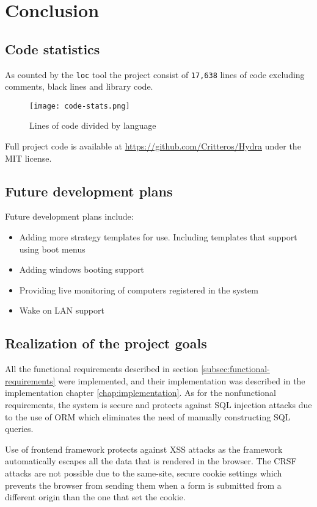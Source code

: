 \documentclass[./main.tex]{subfiles}
\begin{document}
\chapter{Conclusion}

\section{Code statistics}

As counted by the \texttt{loc} \cite{loc} tool the project consist of \texttt{17,638} lines of code excluding
comments, black lines and library code.

\begin{figure}[H]
  \centering
  \texttt{[image: code-stats.png]}
  \caption{Lines of code divided by language}
\end{figure}

Full project code is available at \url{https://github.com/Critteros/Hydra} under the MIT license.

\section{Future development plans}

Future development plans include:

\begin{itemize}
  \item Adding more strategy templates for use. Including templates that support
        using boot menus
  \item Adding windows booting support
  \item Providing live monitoring of computers registered in the system
  \item Wake on LAN support
\end{itemize}


\section{Realization of the project goals}

All the functional requirements described in section \ref{subsec:functional-requirements} were implemented, and their
implementation was described in the implementation chapter \ref{chap:implementation}. As for the nonfunctional requirements, the system is secure and protects against SQL injection
attacks due to the use of ORM which eliminates the need of manually constructing
SQL queries.


Use of frontend framework protects against XSS attacks as the framework automatically escapes all the data that is rendered in the browser. The CRSF attacks are
not possible due to the same-site, secure cookie settings which prevents the browser
from sending them when a form is submitted from a different origin than the one
that set the cookie.
\end{document}
